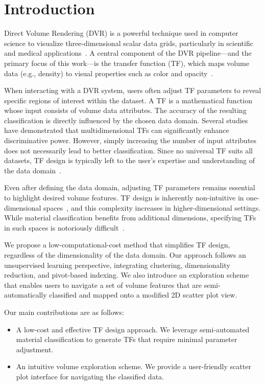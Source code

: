 \section{Introduction}
\label{sect:introduction}

Direct Volume Rendering (DVR) is a powerful technique used in computer science to visualize three-dimensional scalar data grids, particularly in scientific and medical applications~\cite{elvins1992, xu2021}. A central component of the DVR pipeline—and the primary focus of this work—is the transfer function (TF), which maps volume data (e.g., density) to visual properties such as color and opacity~\cite{ljung2016}.

When interacting with a DVR system, users often adjust TF parameters to reveal specific regions of interest within the dataset. A TF is a mathematical function whose input consists of volume data attributes. The accuracy of the resulting classification is directly influenced by the chosen data domain. Several studies~\cite{ljung2016, cai2017, pfister2001, roettger2005} have demonstrated that multidimensional TFs can significantly enhance discriminative power. However, simply increasing the number of input attributes does not necessarily lead to better classification. Since no universal TF suits all datasets, TF design is typically left to the user's expertise and understanding of the data domain~\cite{arens2010}.

Even after defining the data domain, adjusting TF parameters remains essential to highlight desired volume features. TF design is inherently non-intuitive in one-dimensional spaces~\cite{pfister2001, wang2011}, and this complexity increases in higher-dimensional settings. While material classification benefits from additional dimensions, specifying TFs in such spaces is notoriously difficult~\cite{ljung2016, pfister2001, kniss2002, pan2024}.

We propose a low-computational-cost method that simplifies TF design, regardless of the dimensionality of the data domain. Our approach follows an unsupervised learning perspective, integrating clustering, dimensionality reduction, and pivot-based indexing. We also introduce an exploration scheme that enables users to navigate a set of volume features that are semi-automatically classified and mapped onto a modified 2D scatter plot view.

Our main contributions are as follows:

\begin{itemize}
    \item A low-cost and effective TF design approach. We leverage semi-automated material classification to generate TFs that require minimal parameter adjustment.
    \item An intuitive volume exploration scheme. We provide a user-friendly scatter plot interface for navigating the classified data.
\end{itemize}

